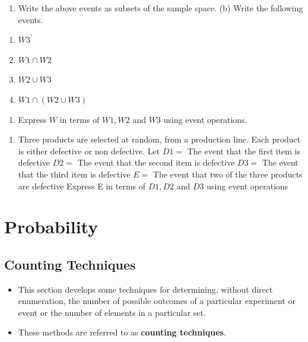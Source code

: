 \documentclass[]{book}
\providecommand{\tightlist}{%
  \setlength{\itemsep}{0pt}\setlength{\parskip}{0pt}}
\begin{document}
\begin{enumerate}
\def\labelenumi{(\alph{enumi})}
\tightlist
\item
  Write the above events as subsets of the sample space. (b) Write the following events.
\end{enumerate}

\begin{enumerate}
\def\labelenumi{\roman{enumi}.}
\tightlist
\item
  \(W3^\prime\)
\item
  \(W1 \cap W2\)
\item
  \(W2 \cup W3\)
\item
  \(W1 \cap (W2 \cup W3)\)
\end{enumerate}

\begin{enumerate}
\def\labelenumi{(\alph{enumi})}
\setcounter{enumi}{2}
\tightlist
\item
  Express \(W\) in terms of \(W1, W2\) and \(W3\) using event operations.
\end{enumerate}

\begin{enumerate}
\def\labelenumi{\arabic{enumi}.}
\setcounter{enumi}{11}
\tightlist
\item
  Three products are selected at random, from a production line. Each product is either defective or non defective. Let
  \(D1 =\) The event that the first item is defective
  \(D2 =\) The event that the second item is defective
  \(D3 =\) The event that the third item is defective
  \(E =\) The event that two of the three products are defective Express E in terms of \(D1, D2\) and \(D3\) using event operations
\end{enumerate}

\hypertarget{probability}{%
\chapter{Probability}\label{probability}}


\hypertarget{counting-techniques}{%
\section{Counting Techniques}\label{counting-techniques}}

\begin{itemize}
\tightlist
\item
  This section develops some techniques for determining, without direct enumeration, the number of possible outcomes of a particular experiment or event or the number of elements in a particular set.
\item
  These methods are referred to as \textbf{counting techniques}.
\end{itemize}
\end{document}
